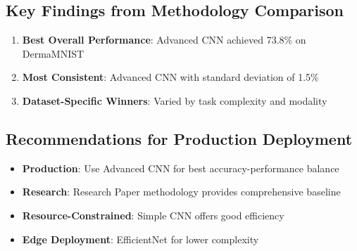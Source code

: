 \documentclass[12pt,a4paper]{article}
\begin{document}
\subsection{Key Findings from Methodology Comparison}

\begin{enumerate}
    \item \textbf{Best Overall Performance}: Advanced CNN achieved 73.8\% on DermaMNIST
    \item \textbf{Most Consistent}: Advanced CNN with standard deviation of 1.5\%
    \item \textbf{Dataset-Specific Winners}: Varied by task complexity and modality
\end{enumerate}

\subsection{Recommendations for Production Deployment}

\begin{itemize}
    \item \textbf{Production}: Use Advanced CNN for best accuracy-performance balance
    \item \textbf{Research}: Research Paper methodology provides comprehensive baseline
    \item \textbf{Resource-Constrained}: Simple CNN offers good efficiency
    \item \textbf{Edge Deployment}: EfficientNet for lower complexity
\end{itemize}
\end{document}
